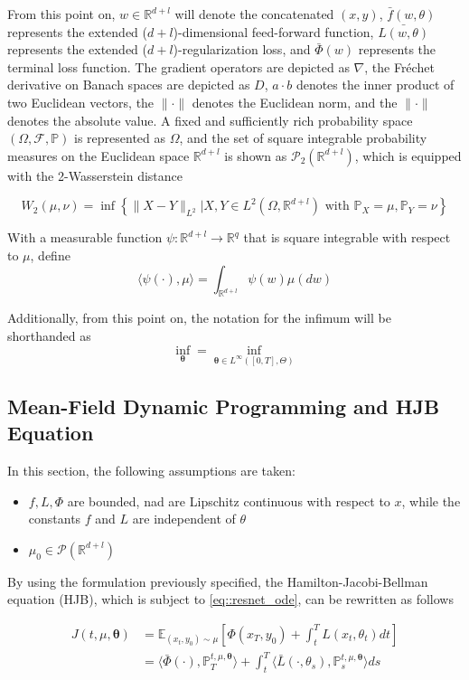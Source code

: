 From this point on, $w \in \mathbb{R}^{d+l}$ will denote the concatenated $(x,y)$, $\bar{f}(w,\theta)$ represents the extended ($d+l$)-dimensional feed-forward function, $\bar{L(w,\theta)}$ represents the extended ($d+l$)-regularization loss, and $\bar{\Phi}(w)$ represents the terminal loss function. The gradient operators are depicted as $\nabla$, the Fréchet derivative on Banach spaces are depicted as $D$, $a\cdot b$ denotes the inner product of two Euclidean vectors, the $\| \cdot \|$ denotes the Euclidean norm, and the $\| \cdot \|$ denotes the absolute value. A fixed and sufficiently rich probability space $(\Omega, \mathcal{F}, \mathbb{P})$ is represented as $\Omega$, and the set of square integrable probability measures on the Euclidean space $\mathbb{R}^{d+l}$ is shown as $\mathcal{P}_2(\mathbb{R}^{d+l})$, which is equipped with the 2-Wasserstein distance

$$W_2(\mu,\nu) = \inf \left\{  \| X - Y \| _{L^2} | X,Y \in L^{2}(\Omega,\mathbb{R}^{d+l}) \text{ with } \mathbb{P}_X = \mu , \mathbb{P}_Y = \nu \right\}$$

With a measurable function $\psi : \mathbb{R}^{d+l} \rightarrow \mathbb{R}^q$ that is square integrable with respect to $\mu$, define
$$\langle \psi(\cdot) , \mu \rangle = \int_{\mathbb{R}^{d+l}} \psi(w) \mu(dw)$$

Additionally, from this point on, the notation for the infimum will be shorthanded as
$$ \inf_{\bm{\theta}} = \inf_{\bm{\theta} \in L^{\infty}([0,T],\Theta)}$$

\subsection{Mean-Field Dynamic Programming and HJB Equation}
In this section, the following assumptions are taken:
\begin{itemize}
    \item $f,L,\Phi$ are bounded, nad are Lipschitz continuous with respect to $x$, while the constants $f$ and $L$ are independent of $\theta $
    \item $\mu_0 \in \mathcal{P}(\mathbb{R}^{d+l})$
\end{itemize}

By using the formulation previously specified, the Hamilton-Jacobi-Bellman equation (HJB), which is subject to \ref{eq::resnet_ode}, can be rewritten as follows

\begin{align*}
J(t,\mu,\bm{\theta}) &= \mathbb{E}_{(x_t,y_0)\sim \mu} \left[ \Phi(x_T,y_0) + \int_t^T L(x_t,\theta_t) dt \right] \\
&= \langle \bar{\Phi}(\cdot),\mathbb{P}^{t,\mu,\bm{\theta}}_T \rangle + \int_t^T \langle \bar{L}(\cdot,\theta_s) , \mathbb{P}_s^{t,\mu,\bm{\theta}} \rangle ds
\end{align*}

